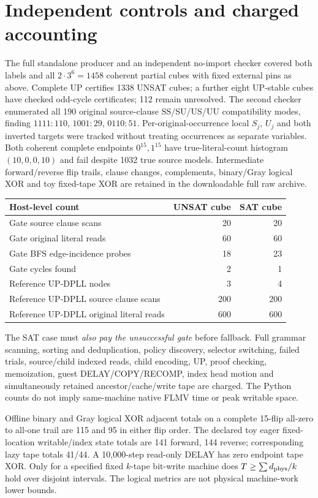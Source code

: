 \documentclass[11pt]{article}
\begin{document}
\section{Independent controls and charged accounting}
The full standalone producer and an independent no-import checker covered both labels and all $2\cdot3^6=1458$ coherent partial cubes with fixed external pins as above. Complete UP certifies 1338 UNSAT cubes; a further eight UP-stable cubes have checked odd-cycle certificates; 112 remain unresolved. The second checker enumerated all 190 original source-clause SS/SU/US/UU compatibility modes, finding $1111:110$, $1001:29$, $0110:51$. Per-original-occurrence local $S_j$, $U_j$ and both inverted targets were tracked without treating occurrences as separate variables. Both coherent complete endpoints $0^{15},1^{15}$ have true-literal-count histogram $(10,0,0,10)$ and fail despite 1032 true source models. Intermediate forward/reverse flip trails, clause changes, complements, binary/Gray logical XOR and toy fixed-tape XOR are retained in the downloadable full raw archive.
\begin{center}\begin{tabular}{lrr}\toprule
Host-level count&UNSAT cube&SAT cube\\\midrule
Gate source clause scans&20&20\\
Gate original literal reads&60&60\\
Gate BFS edge-incidence probes&18&23\\
Gate cycles found&2&1\\
Reference UP-DPLL nodes&3&4\\
Reference UP-DPLL source clause scans&200&200\\
Reference UP-DPLL original literal reads&600&600\\\bottomrule
\end{tabular}\end{center}
The SAT case must \emph{also pay the unsuccessful gate} before fallback. Full grammar scanning, sorting and deduplication, policy discovery, selector switching, failed trials, source/child indexed reads, child encoding, UP, proof checking, memoization, guest DELAY/COPY/RECOMP, index head motion and simultaneously retained ancestor/cache/write tape are charged. The Python counts do not imply same-machine native FLMV time or peak writable space.

Offline binary and Gray logical XOR adjacent totals on a complete 15-flip all-zero to all-one trail are 115 and 95 in either flip order. The declared toy eager fixed-location writable/index state totals are 141 forward, 144 reverse; corresponding lazy tape totals 41/44. A 10,000-step read-only DELAY has zero endpoint tape XOR. Only for a specified fixed $k$-tape bit-write machine does $T\ge\sum d_{\rm phys}/k$ hold over disjoint intervals. The logical metrics are not physical machine-work lower bounds.
\end{document}
